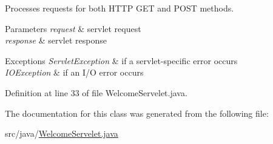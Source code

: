 Processes requests for both H\+T\+TP {\ttfamily G\+ET} and {\ttfamily P\+O\+ST} methods.


\begin{DoxyParams}{Parameters}
{\em request} & servlet request \\
\hline
{\em response} & servlet response \\
\hline
\end{DoxyParams}

\begin{DoxyExceptions}{Exceptions}
{\em Servlet\+Exception} & if a servlet-\/specific error occurs \\
\hline
{\em I\+O\+Exception} & if an I/O error occurs \\
\hline
\end{DoxyExceptions}


Definition at line 33 of file Welcome\+Servelet.\+java.



The documentation for this class was generated from the following file\+:\begin{DoxyCompactItemize}
\item 
src/java/\mbox{\hyperlink{_welcome_servelet_8java}{Welcome\+Servelet.\+java}}\end{DoxyCompactItemize}
